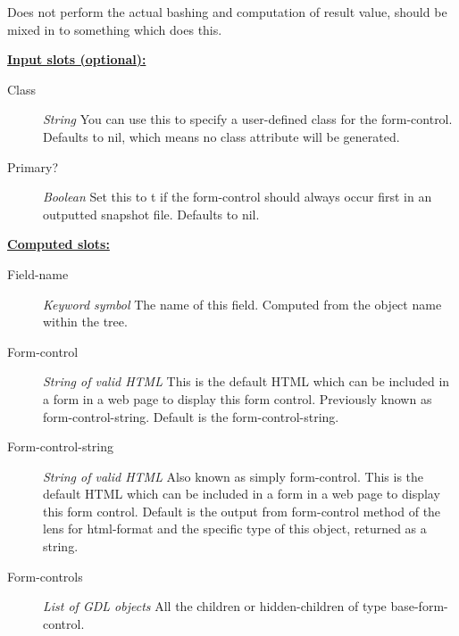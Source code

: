 \documentclass [11pt]{book}
\begin{document}
\begin{itemize}
\begin{description}
Does not perform the actual bashing and computation of result value, should be mixed in to something which does this.



\end{description}








\textbf{
\underline{Input slots (optional):}}

\begin{description}

\item [Class]
\emph{String} You can use this to specify a user-defined class for the form-control. Defaults to nil, which means no class attribute will be generated.


\item [Primary?]
\emph{Boolean} Set this to t if the form-control should always occur first in an outputted snapshot file.
Defaults to nil.


\end{description}






\textbf{
\underline{Computed slots:}}

\begin{description}

\item [Field-name]
\emph{Keyword symbol} The name of this field. Computed from the object name within the tree.


\item [Form-control]
\emph{String of valid HTML} This is the default HTML which can be included in a form in a web page to display this form control.
Previously known as form-control-string. Default is the form-control-string.


\item [Form-control-string]
\emph{String of valid HTML} Also known as simply form-control.
This is the default HTML which can be included in a form in a web page to display this form control.
Default is the output from form-control method of the lens for html-format and the
specific type of this object, returned as a string.


\item [Form-controls]
\emph{List of GDL objects} All the children or hidden-children
of type base-form-control.



\end{description}
\end{itemize}
\end{document}
